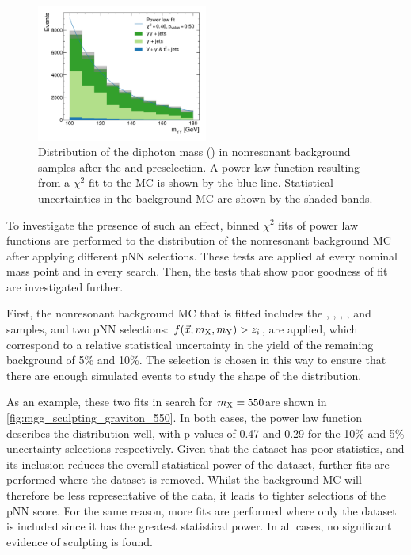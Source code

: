 \begin{figure}
    \centering
    \includegraphics[width=0.5\textwidth]{Figures/Dihiggs/categorisation/mgg_sculpting/graviton/all_bkg/inclusive.pdf}
    \caption[Distribution of \mgg in Nonresonant Background Samples After Preselection]{Distribution of the diphoton mass (\mgg) in nonresonant background samples after the \XHH and \XYttHgg preselection. A power law function resulting from a $\chi^2$ fit to the MC is shown by the blue line. Statistical uncertainties in the background MC are shown by the shaded bands.}\label{fig:mgg_sculpting_inclusive}
\end{figure}

To investigate the presence of such an effect, binned $\chi^2$ fits of power law functions are performed to the \mgg distribution of the nonresonant background MC after applying different pNN selections. These tests are applied at every nominal mass point and in every search. Then, the tests that show poor goodness of fit are investigated further.

First, the nonresonant background MC that is fitted includes the \gjet, \ggjet, \vgamma, \ttbar, \ttgamma and \ttgammagamma samples, and two pNN selections: $f(\vec{x}; m_{\mathrm{X}}, m_{\mathrm{Y}}) > z_i$, are applied, which correspond to a relative statistical uncertainty in the yield of the remaining background of 5\% and 10\%. The selection is chosen in this way to ensure that there are enough simulated events to study the shape of the \mgg distribution.

As an example, these two fits in \XTwoHH search for $m_{\mathrm{X}} = 550$\GeV are shown in \cref{fig:mgg_sculpting_graviton_550}. In both cases, the power law function describes the distribution well, with p-values of 0.47 and 0.29 for the 10\% and 5\% uncertainty selections respectively. Given that the \gjet dataset has poor statistics, and its inclusion reduces the overall statistical power of the dataset, further fits are performed where the \gjet dataset is removed. Whilst the background MC will therefore be less representative of the data, it leads to tighter selections of the pNN score. For the same reason, more fits are performed where only the \ggjet dataset is included since it has the greatest statistical power. In all cases, no significant evidence of sculpting is found.

